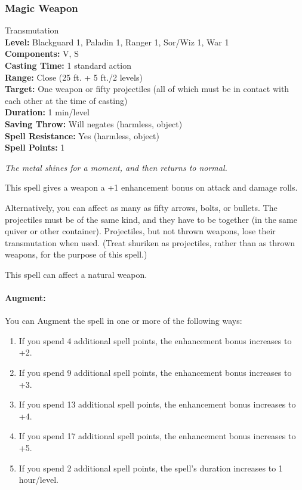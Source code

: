 \subsubsection{Magic Weapon}
\label{Spell:MagicWeapon}
Transmutation
\\ \textbf{Level:} Blackguard 1, Paladin 1, Ranger 1, Sor/Wiz 1, War 1
\\ \textbf{Components:} V, S
\\ \textbf{Casting Time:} 1 standard action
\\ \textbf{Range:} Close (25 ft. + 5 ft./2 levels)
\\ \textbf{Target:} One weapon or fifty projectiles (all of which must be in contact with each other at the time of casting)
\\ \textbf{Duration:} 1 min/level
\\ \textbf{Saving Throw:} Will negates (harmless, object)
\\ \textbf{Spell Resistance:} Yes (harmless, object)
\\ \textbf{Spell Points:} 1

\emph{The metal shines for a moment, and then returns to normal.}

This spell gives a weapon a +1 enhancement bonus on attack and damage rolls.

Alternatively, you can affect as many as fifty arrows, bolts, or bullets. 
The projectiles must be of the same kind, and they have to be together (in the same quiver or other container). 
Projectiles, but not thrown weapons, lose their transmutation when used. (Treat shuriken as projectiles, rather than as thrown weapons, for the purpose of this spell.)

This spell can affect a natural weapon.

\paragraph{Augment:} You can Augment the spell in one or more of the following ways:
\begin{enumerate}
 \item If you spend 4 additional spell points, the enhancement bonus increases to +2.
 \item If you spend 9 additional spell points, the enhancement bonus increases to +3.
 \item If you spend 13 additional spell points, the enhancement bonus increases to +4.
 \item If you spend 17 additional spell points, the enhancement bonus increases to +5.
 \item If you spend 2 additional spell points, the spell's duration increases to 1 hour/level.
\end{enumerate}
